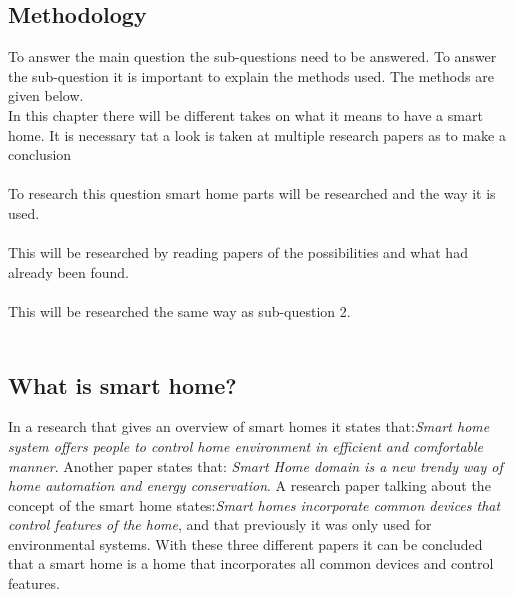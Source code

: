 \subsection{Methodology}
To answer the main question the sub-questions need to be answered. To answer the sub-question it is important to explain the methods used. The methods are given below.
\\
In this chapter there will be different takes on what it means to have a smart home. It is necessary tat a look is taken at multiple research papers as to make a conclusion\\\\
To research this question smart home parts will be researched and the way it is used.\\\\
This will be researched by reading papers of the possibilities and what had already been found.\\\\
This will be researched the same way as sub-question 2.\\\\

\subsection{What is smart home?}
In a research\cite{SmartHomecompare} that gives an overview of smart homes it states that:\textit{Smart home system offers people to control home environment in efficient and comfortable manner}. Another paper\cite{SmartHome_review} states that: \textit{Smart Home domain is a new trendy way of home automation and energy conservation}. A research paper\cite{SmartHomeTech} talking about the concept of the smart home states:\textit{Smart homes incorporate
common devices that control features of the home}, and that previously it was only used for environmental systems. With these three different papers it can be concluded that a smart home is a home that incorporates all common devices and control features.

